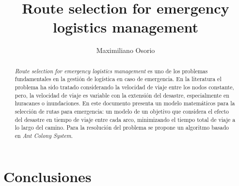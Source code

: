 \documentclass{llncs}
\begin{document}
%
\frontmatter          %
%
\pagestyle{headings}  %

\title{Route selection for emergency logistics management}
%
%
\author{Maximiliano Osorio}
%
%
%

\maketitle              %


\begin{abstract}
\textit{Route selection for emergency logistics management} es uno de los problemas fundamentales en la gestión de logística en caso de emergencia. En la literatura el problema ha sido tratado considerando la velocidad de viaje entre los nodos constante, pero, la velocidad de viaje es variable con la extensión del desastre, especialmente en huracanes o inundaciones.
En este documento presenta un modelo matemáticos para la selección de rutas para emergencia: un modelo de un objetivo que considera el efecto del desastre en tiempo de viaje entre cada arco,  minimizando el tiempo total de viaje a lo largo del camino. Para la resolución del problema se propone un algoritmo basado en  \textit{Ant Colony System}. 


\end{abstract}
%








\section{Conclusiones}
\end{document}
